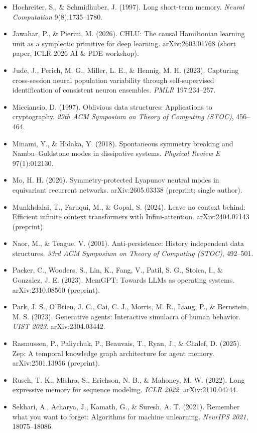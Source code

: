 \documentclass{article}
\begin{document}
\begin{itemize}
\item Hochreiter, S., \& Schmidhuber, J. (1997). Long short-term memory. \emph{Neural Computation} 9(8):1735--1780.
\item Jawahar, P., \& Pierini, M. (2026). CHLU: The causal Hamiltonian learning unit as a symplectic primitive for deep learning. arXiv:2603.01768 (short paper, ICLR 2026 AI \& PDE workshop).
\item Jude, J., Perich, M. G., Miller, L. E., \& Hennig, M. H. (2023). Capturing cross-session neural population variability through self-supervised identification of consistent neuron ensembles. \emph{PMLR} 197:234--257.
\item Micciancio, D. (1997). Oblivious data structures: Applications to cryptography. \emph{29th ACM Symposium on Theory of Computing (STOC)}, 456--464.
\item Minami, Y., \& Hidaka, Y. (2018). Spontaneous symmetry breaking and Nambu--Goldstone modes in dissipative systems. \emph{Physical Review E} 97(1):012130.
\item Mo, H. H. (2026). Symmetry-protected Lyapunov neutral modes in equivariant recurrent networks. arXiv:2605.03338 (preprint; single author).
\item Munkhdalai, T., Faruqui, M., \& Gopal, S. (2024). Leave no context behind: Efficient infinite context transformers with Infini-attention. arXiv:2404.07143 (preprint).
\item Naor, M., \& Teague, V. (2001). Anti-persistence: History independent data structures. \emph{33rd ACM Symposium on Theory of Computing (STOC)}, 492--501.
\item Packer, C., Wooders, S., Lin, K., Fang, V., Patil, S. G., Stoica, I., \& Gonzalez, J. E. (2023). MemGPT: Towards LLMs as operating systems. arXiv:2310.08560 (preprint).
\item Park, J. S., O'Brien, J. C., Cai, C. J., Morris, M. R., Liang, P., \& Bernstein, M. S. (2023). Generative agents: Interactive simulacra of human behavior. \emph{UIST 2023}. arXiv:2304.03442.
\item Rasmussen, P., Paliychuk, P., Beauvais, T., Ryan, J., \& Chalef, D. (2025). Zep: A temporal knowledge graph architecture for agent memory. arXiv:2501.13956 (preprint).
\item Rusch, T. K., Mishra, S., Erichson, N. B., \& Mahoney, M. W. (2022). Long expressive memory for sequence modeling. \emph{ICLR 2022}. arXiv:2110.04744.
\item Sekhari, A., Acharya, J., Kamath, G., \& Suresh, A. T. (2021). Remember what you want to forget: Algorithms for machine unlearning. \emph{NeurIPS 2021}, 18075--18086.

\end{itemize}
\end{document}
